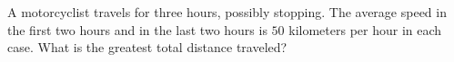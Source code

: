 A motorcyclist travels for three hours, possibly stopping. The average speed in the first two hours and in the last two hours is $50$ kilometers per hour in each case. What is the greatest total distance traveled?
